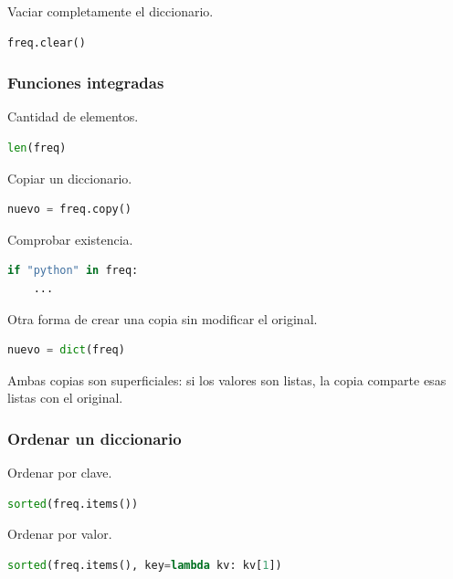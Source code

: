 Vaciar completamente el diccionario.

\begin{lstlisting}[language=Python]
freq.clear()
\end{lstlisting}

\vspace{0.3cm}

\subsubsection{Funciones integradas}

Cantidad de elementos.

\begin{lstlisting}[language=Python]
len(freq)
\end{lstlisting}

Copiar un diccionario.

\begin{lstlisting}[language=Python]
nuevo = freq.copy()
\end{lstlisting}

Comprobar existencia.

\begin{lstlisting}[language=Python]
if "python" in freq:
    ...
\end{lstlisting}

Otra forma de crear una copia sin modificar el original.

\begin{lstlisting}[language=Python]
nuevo = dict(freq)
\end{lstlisting}

Ambas copias son superficiales: si los valores son listas, la copia comparte esas
listas con el original.

\vspace{0.3cm}

\subsubsection{Ordenar un diccionario}

Ordenar por clave.

\begin{lstlisting}[language=Python]
sorted(freq.items())
\end{lstlisting}

Ordenar por valor.

\begin{lstlisting}[language=Python]
sorted(freq.items(), key=lambda kv: kv[1])
\end{lstlisting}

